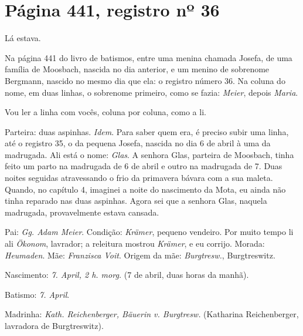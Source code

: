 \documentclass[
  brazilian,
  11pt,
  openany]{book}
\begin{document}
\section{Página 441, registro nº
36}\label{puxe1gina-441-registro-nuxba-36}

Lá estava.

Na página 441 do livro de batismos, entre uma menina chamada Josefa, de
uma família de Moosbach, nascida no dia anterior, e um menino de
sobrenome Bergmann, nascido no mesmo dia que ela: o registro número 36.
Na coluna do nome, em duas linhas, o sobrenome primeiro, como se fazia:
\emph{Meier}, depois \emph{Maria}.

Vou ler a linha com vocês, coluna por coluna, como a li.

Parteira: duas aspinhas. \emph{Idem}. Para saber quem era, é preciso
subir uma linha, até o registro 35, o da pequena Josefa, nascida no dia
6 de abril à uma da madrugada. Ali está o nome: \emph{Glas}. A senhora
Glas, parteira de Moosbach, tinha feito um parto na madrugada de 6 de
abril e outro na madrugada de 7. Duas noites seguidas atravessando o
frio da primavera bávara com a sua maleta. Quando, no capítulo 4,
imaginei a noite do nascimento da Mota, eu ainda não tinha reparado nas
duas aspinhas. Agora sei que a senhora Glas, naquela madrugada,
provavelmente estava cansada.

Pai: \emph{Gg. Adam Meier}. Condição: \emph{Krämer}, pequeno vendeiro.
Por muito tempo li ali \emph{Ökonom}, lavrador; a releitura mostrou
\emph{Krämer}, e eu corrijo. Morada: \emph{Heumaden}. Mãe:
\emph{Franzisca Voit}. Origem da mãe: \emph{Burgtresw.}, Burgtreswitz.

Nascimento: \emph{7. April, 2 h. morg.} (7 de abril, duas horas da
manhã).

Batismo: \emph{7. April}.

Madrinha: \emph{Kath. Reichenberger, Bäuerin v. Burgtresw.} (Katharina
Reichenberger, lavradora de Burgtreswitz).
\end{document}
